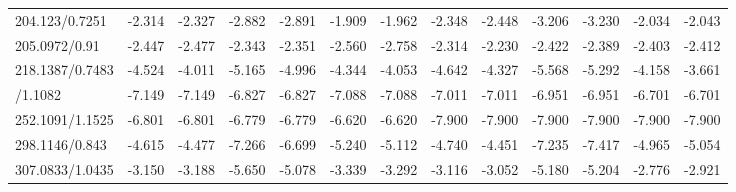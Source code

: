 \documentclass[]{elsarticle} %
\begin{document}
\begin{table}[H]
{\begin{tabular}[t]{lrrrrrrrrrrrr}
\rowcolor{gray!6}  204.123/0.7251 & -2.314 & -2.327 & -2.882 & -2.891 & -1.909 & -1.962 & -2.348 & -2.448 & -3.206 & -3.230 & -2.034 & -2.043\\
205.0972/0.91 & -2.447 & -2.477 & -2.343 & -2.351 & -2.560 & -2.758 & -2.314 & -2.230 & -2.422 & -2.389 & -2.403 & -2.412\\
\rowcolor{gray!6}  218.1387/0.7483 & -4.524 & -4.011 & -5.165 & -4.996 & -4.344 & -4.053 & -4.642 & -4.327 & -5.568 & -5.292 & -4.158 & -3.661\\
\addlinespace
238.0947/1.1082 & -7.149 & -7.149 & -6.827 & -6.827 & -7.088 & -7.088 & -7.011 & -7.011 & -6.951 & -6.951 & -6.701 & -6.701\\
\rowcolor{gray!6}  252.1091/1.1525 & -6.801 & -6.801 & -6.779 & -6.779 & -6.620 & -6.620 & -7.900 & -7.900 & -7.900 & -7.900 & -7.900 & -7.900\\
298.1146/0.843 & -4.615 & -4.477 & -7.266 & -6.699 & -5.240 & -5.112 & -4.740 & -4.451 & -7.235 & -7.417 & -4.965 & -5.054\\
\rowcolor{gray!6}  307.0833/1.0435 & -3.150 & -3.188 & -5.650 & -5.078 & -3.339 & -3.292 & -3.116 & -3.052 & -5.180 & -5.204 & -2.776 & -2.921\\
\bottomrule
\end{tabular}}
\end{table}
\end{document}
